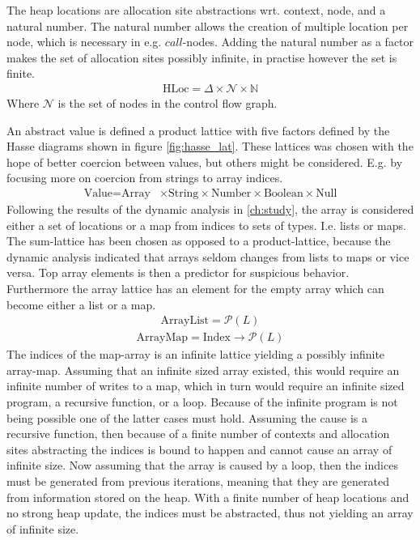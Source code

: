 The heap locations are allocation site abstractions wrt. context, node, and a natural number. The natural number allows the creation of multiple location per node, which is necessary in e.g. $\mathit{call}$-nodes. Adding the natural number as a factor makes the set of allocation sites possibly infinite, in practise however the set is finite. 
\begin{align}
\text{HLoc}  = \Delta \times \mathcal{N} \times \mathbb{N}
\end{align}
Where $\mathcal{N}$ is the set of nodes in the control flow graph. 

An abstract value is defined a product lattice with five factors defined by the Hasse diagrams shown in figure \ref{fig:hasse_lat}. These lattices was chosen with the hope of better coercion between values, but others might be considered. E.g. by focusing more on coercion from strings to array indices.
\begin{align}
\text{Value} = \text{Array} & \times \text{String} \times \text{Number} \times \text{Boolean}  \times \text{Null}
\end{align}
Following the results of the dynamic analysis in \ref{ch:study}, the array is considered either a set of locations or a map from indices to sets of types. I.e. lists or maps. The sum-lattice has been chosen as opposed to a product-lattice, because the dynamic analysis indicated that arrays seldom changes from lists to maps or vice versa. Top array elements is then a predictor for suspicious behavior. Furthermore the array lattice has an element for the empty array which can become either a list or a map.  
\begin{align}
\text{ArrayList}= \mathcal{P}( L )
\end{align}
\begin{align}
\text{ArrayMap}=\text{Index} \rightarrow \mathcal{P}( L )
\end{align}
The indices of the map-array is an infinite lattice yielding a possibly infinite array-map. Assuming that an infinite sized array existed, this would require an infinite number of writes to a map, which in turn would require an infinite sized program, a recursive function, or a loop. Because of the infinite program is not being possible one of the latter cases must hold. Assuming the cause is a recursive function, then because of a finite number of contexts and allocation sites abstracting the indices is bound to happen and cannot cause an array of infinite size. Now assuming that the array is caused by a loop, then the indices must be generated from previous iterations, meaning that they are generated from information stored on the heap. With a finite number of heap locations and no strong heap update, the indices must be abstracted, thus not yielding an array of infinite size.
